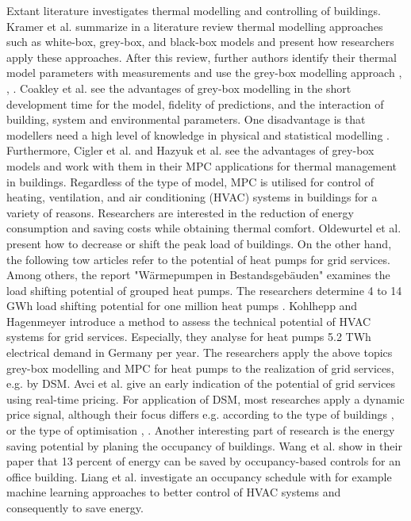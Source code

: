     Extant literature investigates thermal modelling and controlling of buildings. Kramer et al. \cite{Kramer.2012} summarize in a literature review thermal modelling approaches such as white-box, grey-box, and black-box models and present how researchers apply these approaches. After this review, further authors identify their thermal model parameters with measurements and use the grey-box modelling approach \cite{Harb.2016}, \cite{Freund.2020}, \cite{EvelynSperber.2019}. Coakley et al. \cite{Coakley.2014} see the advantages of grey-box modelling in the short development time for the model, fidelity of predictions, and the interaction of building, system and environmental parameters. One disadvantage is that modellers need a high level of knowledge in physical and statistical modelling \cite{Coakley.2014}. Furthermore, Cigler et al. \cite{JiriCigler.} and Hazyuk et al. \cite{Hazyuk.2012b} see the advantages of grey-box models and work with them in their MPC applications for thermal management in buildings. 
    \newline
    Regardless of the type of model, MPC is utilised for control of heating, ventilation, and air conditioning (HVAC)  systems in buildings for a variety of reasons. Researchers are interested in the reduction of energy consumption \cite{Hazyuk.2012b} and saving costs \cite{Zwickel.2019} while obtaining thermal comfort. Oldewurtel et al. \cite{Oldewurtel.2010} present how to decrease or shift the peak load of buildings.
    \newline
    On the other hand, the following tow articles refer to the potential of heat pumps for grid services. Among others, the report "Wärmepumpen in Bestandsgebäuden" examines the load shifting potential of grouped heat pumps. The researchers determine 4 to 14 GWh load shifting potential for one million heat pumps \cite{WPimBestand.2020}.
    Kohlhepp and Hagenmeyer \cite{Kohlhepp.2017} introduce a method to assess the technical potential of HVAC systems for grid services. Especially, they analyse for heat pumps 5.2 TWh electrical demand in Germany per year.
    \newline
    The researchers apply the above topics grey-box modelling and MPC for heat pumps to the realization of grid services, e.g. by DSM. Avci et al. \cite{Avci.2013} give an early indication of the potential of grid services using real-time pricing. For application of DSM, most researches apply a dynamic price signal, although their focus differs e.g. according to the type of buildings \cite{Bianchini.2019}, \cite{Kim.2018} or the type of optimisation \cite{Bianchini.2019}, \cite{Bianchini.2016}.\newline 
    Another interesting part of research is the energy saving potential by planing the occupancy of buildings. Wang et al. \cite{Wang.2019} show in their paper that 13 percent of energy can be saved by occupancy-based controls for an office building. Liang et al. \cite{Liang.2016} investigate an occupancy schedule with for example machine learning approaches to better control of HVAC systems and consequently to save energy.\newline
    
